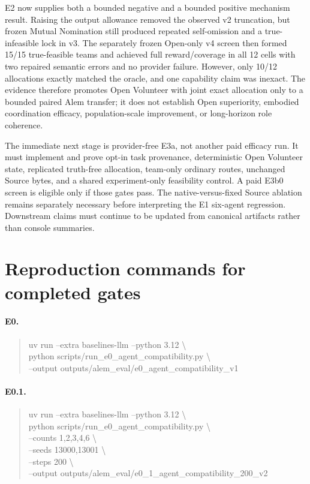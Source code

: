 \documentclass[11pt]{article}
\begin{document}
E2 now supplies both a bounded negative and a bounded positive mechanism
result.  Raising the output allowance removed the observed v2 truncation, but
frozen Mutual Nomination still produced repeated self-omission and a
true-infeasible lock in v3.  The separately frozen Open-only v4 screen then
formed 15/15 true-feasible teams and achieved full reward/coverage in all 12
cells with two repaired semantic errors and no provider failure.  However,
only 10/12 allocations exactly matched the oracle, and one capability claim
was inexact.  The evidence therefore promotes Open Volunteer with joint exact
allocation only to a bounded paired Alem transfer; it does not establish Open
superiority, embodied coordination efficacy, population-scale improvement, or
long-horizon role coherence.

The immediate next stage is provider-free E3a, not another paid efficacy run.
It must implement and prove opt-in task provenance, deterministic Open
Volunteer state, replicated truth-free allocation, team-only ordinary routes,
unchanged Source bytes, and a shared experiment-only feasibility control.  A
paid E3b0 screen is eligible only if those gates pass.  The native-versus-fixed
Source ablation remains separately necessary before interpreting the E1
six-agent regression.  Downstream claims must continue to be updated from
canonical artifacts rather than console summaries.

\appendix

\section{Reproduction commands for completed gates}

\paragraph{E0.}
\begin{quote}
\small\ttfamily\raggedright
uv run --extra baselines-llm --python 3.12 \textbackslash\\
\quad python scripts/run\_e0\_agent\_compatibility.py \textbackslash\\
\quad --output outputs/alem\_eval/e0\_agent\_compatibility\_v1
\end{quote}

\paragraph{E0.1.}
\begin{quote}
\small\ttfamily\raggedright
uv run --extra baselines-llm --python 3.12 \textbackslash\\
\quad python scripts/run\_e0\_agent\_compatibility.py \textbackslash\\
\quad --counts 1,2,3,4,6 \textbackslash\\
\quad --seeds 13000,13001 \textbackslash\\
\quad --steps 200 \textbackslash\\
\quad --output
outputs/alem\_eval/e0\_1\_agent\_compatibility\_200\_v2
\end{quote}
\end{document}
